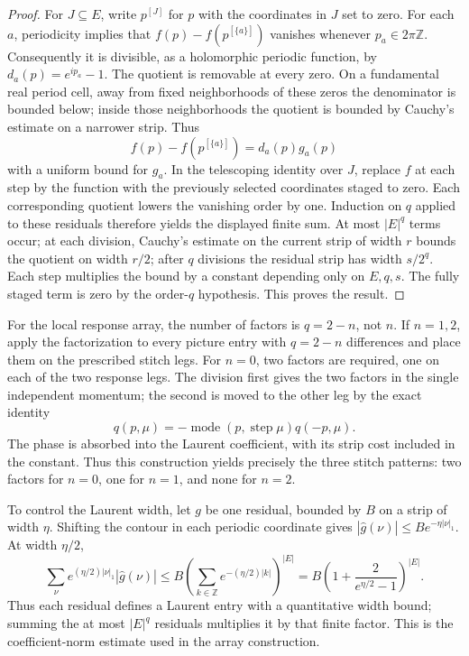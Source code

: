 \begin{proof}
For $J\subseteq E$, write $p^{[J]}$ for $p$ with the coordinates in $J$
set to zero. For each $a$, periodicity implies that
$f(p)-f(p^{[\{a\}]})$ vanishes whenever $p_a\in2\pi\mathbb Z$.
Consequently it is divisible, as a holomorphic periodic function, by
$d_a(p)=e^{ip_a}-1$. The quotient is removable at every zero. On a
fundamental real period cell, away from fixed neighborhoods of these
zeros the denominator is bounded below; inside those neighborhoods the
quotient is bounded by Cauchy's estimate on a narrower strip. Thus
\[
 f(p)-f(p^{[\{a\}]})=d_a(p)g_a(p)
\]
with a uniform bound for $g_a$. In the telescoping identity over $J$,
replace $f$ at each step by the function with the previously selected
coordinates staged to zero. Each corresponding quotient lowers the
vanishing order by one. Induction on $q$ applied to these residuals
therefore yields the displayed finite sum. At most $|E|^q$ terms occur;
at each division, Cauchy's estimate on the current strip of width $r$
bounds the quotient on width $r/2$; after $q$ divisions the residual
strip has width $s/2^q$. Each step multiplies the bound by a constant
depending only on $E,q,s$. The fully
staged term is zero by the order-$q$ hypothesis. This proves the result.
\end{proof}

For the local response array, the number of factors is $q=2-n$, not
$n$. If $n=1,2$, apply the factorization to every picture entry with
$q=2-n$ differences and place them on the prescribed stitch legs. For
$n=0$, two factors are required, one on each of the two response legs.
The division first gives the two factors in the single independent
momentum; the second is moved to the other leg by the exact identity
\[
 q(p,\mu)=-\operatorname{mode}(p,\operatorname{step}\mu)q(-p,\mu).
\]
The phase is absorbed into the Laurent coefficient, with its strip cost
included in the constant. Thus this construction yields precisely the
three stitch patterns: two factors for $n=0$, one for $n=1$, and none for
$n=2$.

To control the Laurent width, let $g$ be one residual, bounded by $B$
on a strip of width $\eta$. Shifting the contour in each periodic
coordinate gives $|\widehat g(\nu)|\leq B e^{-\eta|\nu|_1}$. At width
$\eta/2$,
\[
 \sum_{\nu}e^{(\eta/2)|\nu|_1}|\widehat g(\nu)|
 \leq B\left(\sum_{k\in\mathbb Z}e^{-(\eta/2)|k|}\right)^{|E|}
 =B\left(1+\frac{2}{e^{\eta/2}-1}\right)^{|E|}.
\]
Thus each residual defines a Laurent entry with a quantitative width
bound; summing the at most $|E|^q$ residuals multiplies it by that finite
factor. This is the coefficient-norm estimate used in the array
construction.

